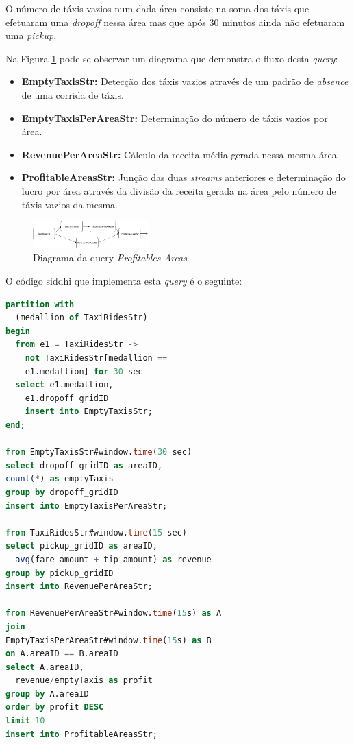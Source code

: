 \documentclass[article]{IEEEtran}
\begin{document}
O número de táxis vazios num dada área consiste na soma dos táxis que efetuaram uma \textit{dropoff} nessa área mas que após 30 minutos ainda não efetuaram uma \textit{pickup}.

Na Figura \ref{fig:profitablesAreasDiagram} pode-se observar um diagrama que demonstra o fluxo desta \textit{query}:
\begin{itemize}
\item \textbf{EmptyTaxisStr:} Detecção dos táxis vazios através de um padrão de \textit{absence} de uma corrida de táxis.
\item \textbf{EmptyTaxisPerAreaStr:} Determinação do número de táxis vazios por área.
\item \textbf{RevenuePerAreaStr:} Cálculo da receita média gerada nessa mesma área.
\item \textbf{ProfitableAreasStr:} Junção das duas \textit{streams} anteriores e determinação do lucro por área através da divisão da receita gerada na área pelo número de táxis vazios da mesma.
\end{itemize}

\begin{figure}[hbtp]
    \centering
        \includegraphics[width=0.4\textwidth]{images/profitableAreas}
    \caption{Diagrama da query \textit{Profitables Areas}.}
    \label{fig:profitablesAreasDiagram}
\end{figure}

O código siddhi que implementa esta \textit{query} é o seguinte:

\begin{lstlisting}[language=SQL]
partition with 
  (medallion of TaxiRidesStr)
begin
  from e1 = TaxiRidesStr ->
    not TaxiRidesStr[medallion == 
    e1.medallion] for 30 sec
  select e1.medallion, 
    e1.dropoff_gridID
    insert into EmptyTaxisStr;
end;

from EmptyTaxisStr#window.time(30 sec)
select dropoff_gridID as areaID,
count(*) as emptyTaxis
group by dropoff_gridID
insert into EmptyTaxisPerAreaStr;

from TaxiRidesStr#window.time(15 sec)
select pickup_gridID as areaID,
  avg(fare_amount + tip_amount) as revenue
group by pickup_gridID
insert into RevenuePerAreaStr;

from RevenuePerAreaStr#window.time(15s) as A 
join
EmptyTaxisPerAreaStr#window.time(15s) as B 
on A.areaID == B.areaID
select A.areaID,
  revenue/emptyTaxis as profit
group by A.areaID
order by profit DESC
limit 10
insert into ProfitableAreasStr;
\end{lstlisting}
\end{document}
